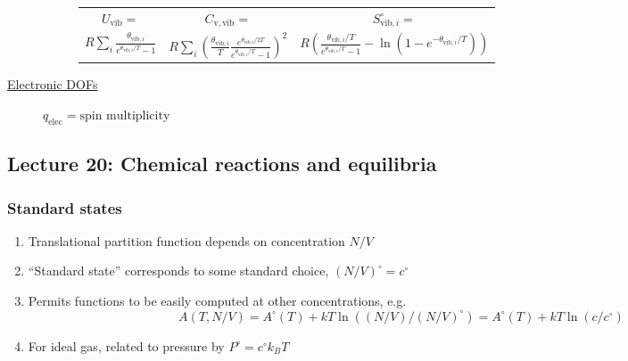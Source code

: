 \documentclass[11pt]{article}
\begin{document}
\begin{table}
\begin{center}
\begin{description}
\begin{description}
\begin{tabular}{ccc}
$ U_\mathrm{vib}= $ & $  C_\mathrm{v,vib} = $ & $S^\circ_{\mathrm{vib},i}=$ \\
$\displaystyle
R\sum_i\frac{\theta_{\mathrm{vib},i}}{e^{\theta_{\mathrm{vib},i}/T}-1}$ &
$\displaystyle R \sum_i \left (
  \frac{\theta_{\mathrm{vib},i}}{T}\frac{e^{\theta_{\mathrm{vib},i}/2T}}{e^{\theta_{\mathrm{vib},i}/T}-1}
\right )^2 $ & $\displaystyle R \left ( \frac{\theta_{\mathrm{vib},i}/T}{e^{\theta_{\mathrm{vib},i}/T}-1}
-\ln(1-e^{-\theta_{\mathrm{vib},i}/T})\right ) $ \\
\end{tabular}

\end{description}
\item[\underline{Electronic DOFs}] {}
$q_\mathrm{elec} = \text{spin multiplicity}$


\end{description}
\end{center}
\end{table}

\subsection{Lecture 20: Chemical reactions and equilibria}
\label{sec:orgb40e2f7}
\subsubsection{Standard states}
\label{sec:orgf4f554b}
\begin{enumerate}
\item Translational partition function depends on concentration \(N/V\)
\item ``Standard state'' corresponds to some standard choice, \((N/V)^\circ = c^\circ\)
\item Permits functions to be easily computed at other concentrations, e.g.
\begin{displaymath}
A(T,N/V)  = A^\circ(T) + k T \ln\left ( (N/V)/(N/V)^\circ \right ) =A^\circ(T) + k T \ln \left ( c/c^\circ \right )
\end{displaymath}
\item For ideal gas, related to pressure by \(P^\circ = c^\circ k_B T\)
\end{enumerate}
\end{document}
